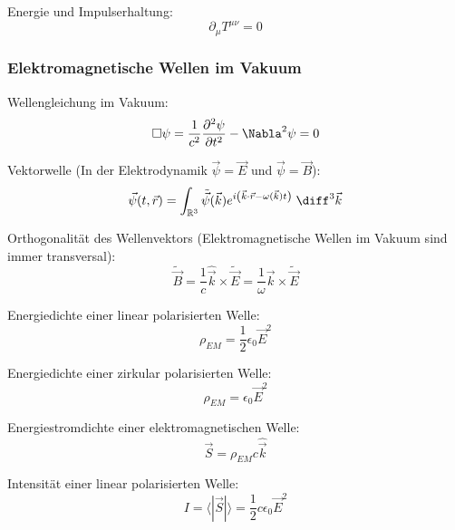 \documentclass[11pt]{article}
\numberwithin{equation}{section}
\begin{document}
        Energie und Impulserhaltung:
        \begin{equation}
          \partial_\mu T^{\mu\nu} = 0
        \end{equation}


      \subsubsection{Elektromagnetische Wellen im Vakuum}
        Wellengleichung im Vakuum:
        \begin{equation}
          \Box\psi = \frac{1}{c^2} \frac{\partial^2 \psi}{\partial t^2} - \Nabla^2 \psi = 0
        \end{equation}

        Vektorwelle (In der Elektrodynamik $\vec{\psi}=\vec{E}$ und $ \vec{\psi}=\vec{B}$):
        \begin{equation}
          \vec{\psi}(t,\vec{r}) = \int_{\mathbb{R}^3} \tilde{\vec{\psi}} (\vec{k}) e^{i\left(\vec{k}\cdot\vec{r} - \omega(\vec{k})t \right)}\; \diff^3\vec{k}
        \end{equation}

        Orthogonalität des Wellenvektors (Elektromagnetische Wellen im Vakuum sind immer transversal):
        \begin{equation}
          \tilde{\vec{B}} = \frac{1}{c}\hat{\vec{k}}\times\tilde{\vec{E}} = \frac{1}{\omega}\vec{k}\times\tilde{\vec{E}}
        \end{equation}

        Energiedichte einer linear polarisierten Welle:
        \begin{equation}
          \rho_{EM} = \frac{1}{2}\epsilon_0\vec{E}^2
        \end{equation}

        Energiedichte einer zirkular polarisierten Welle:
        \begin{equation}
          \rho_{EM} = \epsilon_0\vec{E}^2
        \end{equation}

        Energiestromdichte einer elektromagnetischen Welle:
        \begin{equation}
          \vec{S} = \rho_{EM}c\hat{\vec{k}}
        \end{equation}

        Intensität einer linear polarisierten Welle:
        \begin{equation}
          I = \langle|\vec{S}|\rangle = \frac{1}{2}c\epsilon_0\vec{E}^2
        \end{equation}
\end{document}
